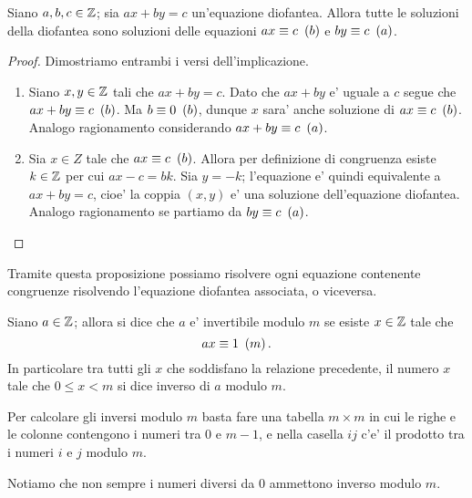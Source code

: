 \begin{proposition}
    Siano $a, b, c \in \mathbb{Z}$; sia $ax + by = c$ un'equazione diofantea. Allora tutte le soluzioni della diofantea sono soluzioni delle equazioni $ax \equiv c \ \left(b\right)$ e $by \equiv c \ \left(a\right)$.
\end{proposition}
\begin{proof}
    Dimostriamo entrambi i versi dell'implicazione.
    \begin{enumerate}
        \item Siano $x, y \in \mathbb{Z}$ tali che $ax + by = c$. Dato che $ax + by$ e' uguale a $c$ segue che $ax + by \equiv c \ \left(b\right)$. Ma $b \equiv 0 \ \left(b\right)$, dunque $x$ sara' anche soluzione di $ax \equiv c \ \left(b\right)$. Analogo ragionamento considerando $ax + by \equiv c \ \left(a\right)$.
        \item Sia $x \in Z$ tale che $ax \equiv c \ \left(b\right)$. Allora per definizione di congruenza esiste $k \in \mathbb{Z}$ per cui $ax - c = bk$. Sia $y = -k$; l'equazione e' quindi equivalente a $ax + by = c$, cioe' la coppia $(x, y)$ e' una soluzione dell'equazione diofantea. Analogo ragionamento se partiamo da $by \equiv c \ \left(a\right)$.
    \end{enumerate}
\end{proof}

Tramite questa proposizione possiamo risolvere ogni equazione contenente congruenze risolvendo l'equazione diofantea associata, o viceversa.

\begin{definition}
    Siano $a \in \mathbb{Z}$; allora si dice che $a$ e' invertibile modulo $m$ se esiste  $x \in \mathbb{Z}$ tale che \[
        ax \equiv 1 \ \left(m\right)
    .\]
    In particolare tra tutti gli $x$ che soddisfano la relazione precedente, il numero $x$ tale che $0 \leq x < m$ si dice inverso di $a$ modulo $m$.
\end{definition}
Per calcolare gli inversi modulo $m$ basta fare una tabella $m \times m$ in cui le righe e le colonne contengono i numeri tra $0$ e $m-1$, e nella casella $ij$ c'e' il prodotto tra i numeri $i$ e $j$ modulo $m$.

Notiamo che non sempre i numeri diversi da $0$ ammettono inverso modulo $m$.


